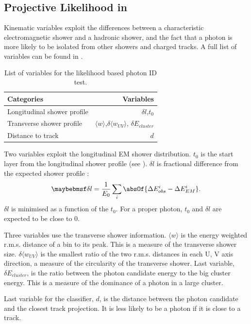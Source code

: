 \subsection{Projective Likelihood in \pandora}

Kinematic variables exploit the differences between a characteristic electromagnetic shower and a hadronic shower, and the fact that a photon is more likely to be isolated from other showers and charged tracks. A full list of variables can be found in .

\begin{table}[htbp] \centering \smallskip
\begin{tabular}{l r }
\hline
\hline
Categories&  Variables\\
\hline
Longitudinal shower profile & $\delta{l}$,$t_0$ \\
Transverse shower profile & $\langle{w}\rangle$,$\delta{\langle{w_{UV}}\rangle}$, $\delta E_{cluster}$ \\
Distance to track &  $d$ \\
\hline
\hline
\end{tabular}
\caption
{List of variables for the likelihood based photon ID test.}
\label{tab:photonPhotonIDvar}
\end{table}

Two variables exploit the longitudinal EM shower distribution. $t_0$ is the start layer from the longitudinal shower profile (see ). $\delta{l}$ is fractional difference from the expected shower profile \cite{Thomson:2009rp}:
\begin{equation}
\delta l = \frac{1}{E_0}\sum_{i}^{}\absOf{\Delta E_{obs}^i - \Delta E_{EM}^i }.
\end{equation}
$\delta l$ is minimised as a function of the $t_0$. For a proper photon, $t_0$  and $\delta l $ are expected to be close to 0.

Three variables use the transverse shower information. $\langle{w}\rangle$ is the energy weighted r.m.s. distance of a bin to its peak. This is a measure of the transverse shower size. $\delta{\langle{w_{UV}}\rangle}$ is the smallest ratio of the two r.m.s. distances in each U, V axis direction, a measure of the circularity of the transverse shower. Last variable, $\delta E_{cluster}$, is the  ratio between the photon candidate energy to the big cluster energy. This is a measure of the dominance of a photon in a large cluster.

Last variable for the classifier, $d$, is the distance between the photon candidate and the closest track projection. It is less likely to be a photon if it is close to a track.


